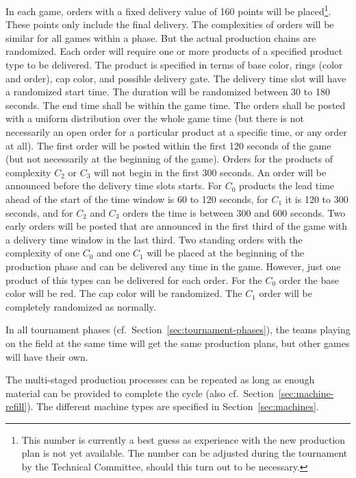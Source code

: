 \documentclass[12pt,twoside]{article}
\newcommand{\refsec}[1]{Section~\ref{#1}}
\begin{document}
In each game, orders with a fixed delivery value of 160 points will be
placed\footnote{This number is currently a best guess as experience
  with the new production plan is not yet available. The number can be
  adjusted during the tournament by the Technical Committee, should
  this turn out to be necessary.}. These points only include the final
delivery. The complexities of orders will be similar for all games
within a phase. But the actual production chains are randomized. Each
order will require one or more products of a specified product type to
be delivered. The product is specified in terms of base color, rings
(color and order), cap color, and possible delivery gate. The delivery
time slot will have a randomized start time. The duration will be
randomized between 30 to 180 seconds. The end time shall be within the
game time. The orders shall be posted with a uniform distribution over
the whole game time (but there is not necessarily an open order for a
particular product at a specific time, or any order at all). The first
order will be posted within the first 120 seconds of the game (but not
necessarily at the beginning of the game). Orders for the products of
complexity $C_2$ or $C_3$ will not begin in the first 300 seconds. An
order will be announced before the delivery time slots starts. For
$C_0$ products the lead time ahead of the start of the time window is
60 to 120 seconds, for $C_1$ it is 120 to 300 seconds, and for $C_2$
and $C_3$ orders the time is between 300 and 600 seconds. Two early
orders will be posted that are announced in the first third of the
game with a delivery time window in the last third. Two standing orders
with the complexity of one $C_0$ and one $C_1$ will be placed at the beginning of the
production phase and can be delivered any time in the game. However,
just one product of this types can be delivered for each order.
For the $C_0$ order the base color will be red. The cap color will be
randomized.
The $C_1$ order will be completely randomized as normally.

In all tournament phases (cf.~\refsec{sec:tournament-phases}), the
teams playing on the field at the same time will get the same
production plans, but other games will have their own.

The multi-staged production processes can be repeated as long as
enough material can be provided to complete the cycle (also
cf.~\refsec{sec:machine-refill}). The different machine types are
specified in Section~\ref{sec:machines}.
\end{document}
